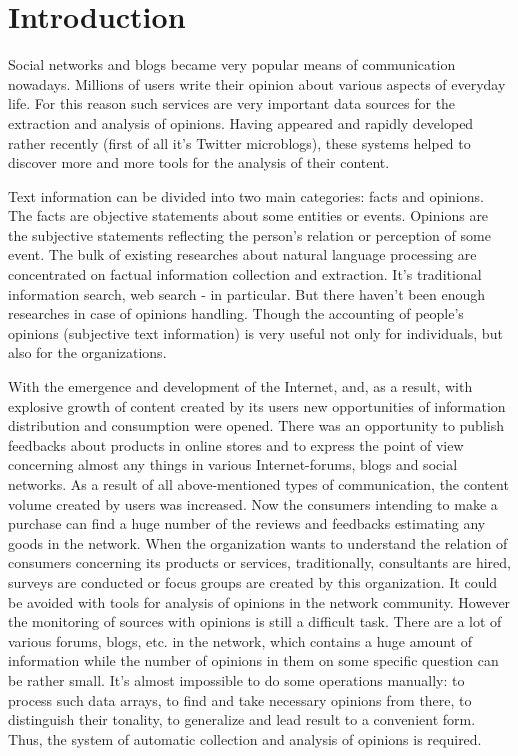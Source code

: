 \section{Introduction}
Social networks and blogs became very popular means of communication nowadays. Millions of users write their opinion about various aspects of everyday life. For this reason such services are very important data sources for the extraction and analysis of opinions. Having appeared and rapidly developed rather recently (first of all it's Twitter microblogs), these systems helped to discover more and more tools for the analysis of their content.

Text information can be divided into two main categories: facts and opinions. The facts are objective statements about some entities or events. Opinions are the subjective statements reflecting the  person's relation or perception of some event. The bulk of existing researches about natural language processing are concentrated on factual information collection and extraction. It's traditional information search, web search - in particular. But there haven't been enough researches in case of opinions handling. Though the accounting of people's opinions (subjective text information) is very useful not only for individuals, but also for the organizations. 

With the emergence and development of the Internet, and, as a result, with explosive growth of content created by its users new opportunities of information distribution and consumption were opened. There was an opportunity to publish feedbacks about products in online stores and to express the point of view concerning almost any things in various Internet-forums, blogs and social networks. As a result of all above-mentioned types of communication, the content volume created by users was increased. Now the consumers intending to make a purchase can find a huge number of the reviews and feedbacks estimating any goods in the network. When the organization wants to understand the relation of consumers concerning its products or services, traditionally, consultants are hired, surveys are conducted or focus groups are created by this organization. It could be avoided with tools for analysis of opinions in the network community. However the monitoring of sources with opinions is still a difficult task. There are a lot of various forums, blogs, etc. in the network, which contains a huge amount of information while the number of opinions in them on some specific question can be rather small. It's almost impossible to do some operations manually: to process such data arrays, to find and take necessary opinions from there, to distinguish their tonality, to generalize and lead result to a convenient form. Thus, the system of automatic collection and analysis of opinions is required.

